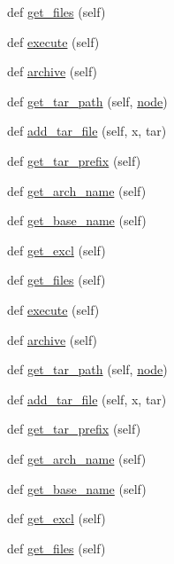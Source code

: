 \begin{DoxyCompactItemize}
def \hyperlink{classwaflib_1_1_scripting_1_1_dist_afe6d98e6e39822f250f9302b07c0afab}{get\+\_\+files} (self)
\item 
def \hyperlink{classwaflib_1_1_scripting_1_1_dist_a1ed5e146ed66af4d02c205dbb428f49f}{execute} (self)
\item 
def \hyperlink{classwaflib_1_1_scripting_1_1_dist_aaaa979f347096bd91a2feb553bbacf35}{archive} (self)
\item 
def \hyperlink{classwaflib_1_1_scripting_1_1_dist_a64707e5623688ede0aa955afe3640b98}{get\+\_\+tar\+\_\+path} (self, \hyperlink{structnode}{node})
\item 
def \hyperlink{classwaflib_1_1_scripting_1_1_dist_a2afba826ee8f5b522e6ce822f9878755}{add\+\_\+tar\+\_\+file} (self, x, tar)
\item 
def \hyperlink{classwaflib_1_1_scripting_1_1_dist_a20b28677d28b516c05e8af1b20c65c67}{get\+\_\+tar\+\_\+prefix} (self)
\item 
def \hyperlink{classwaflib_1_1_scripting_1_1_dist_a98d05f8f6a2fc8f33814fbc654135724}{get\+\_\+arch\+\_\+name} (self)
\item 
def \hyperlink{classwaflib_1_1_scripting_1_1_dist_aba6bf457f948f8ac80d1de9f47a59ac2}{get\+\_\+base\+\_\+name} (self)
\item 
def \hyperlink{classwaflib_1_1_scripting_1_1_dist_a1280a2469cad7d9fa88c3afcbbfa920d}{get\+\_\+excl} (self)
\item 
def \hyperlink{classwaflib_1_1_scripting_1_1_dist_afe6d98e6e39822f250f9302b07c0afab}{get\+\_\+files} (self)
\item 
def \hyperlink{classwaflib_1_1_scripting_1_1_dist_a1ed5e146ed66af4d02c205dbb428f49f}{execute} (self)
\item 
def \hyperlink{classwaflib_1_1_scripting_1_1_dist_aaaa979f347096bd91a2feb553bbacf35}{archive} (self)
\item 
def \hyperlink{classwaflib_1_1_scripting_1_1_dist_a64707e5623688ede0aa955afe3640b98}{get\+\_\+tar\+\_\+path} (self, \hyperlink{structnode}{node})
\item 
def \hyperlink{classwaflib_1_1_scripting_1_1_dist_a2afba826ee8f5b522e6ce822f9878755}{add\+\_\+tar\+\_\+file} (self, x, tar)
\item 
def \hyperlink{classwaflib_1_1_scripting_1_1_dist_a20b28677d28b516c05e8af1b20c65c67}{get\+\_\+tar\+\_\+prefix} (self)
\item 
def \hyperlink{classwaflib_1_1_scripting_1_1_dist_a98d05f8f6a2fc8f33814fbc654135724}{get\+\_\+arch\+\_\+name} (self)
\item 
def \hyperlink{classwaflib_1_1_scripting_1_1_dist_aba6bf457f948f8ac80d1de9f47a59ac2}{get\+\_\+base\+\_\+name} (self)
\item 
def \hyperlink{classwaflib_1_1_scripting_1_1_dist_a1280a2469cad7d9fa88c3afcbbfa920d}{get\+\_\+excl} (self)
\item 
def \hyperlink{classwaflib_1_1_scripting_1_1_dist_afe6d98e6e39822f250f9302b07c0afab}{get\+\_\+files} (self)
\end{DoxyCompactItemize}
